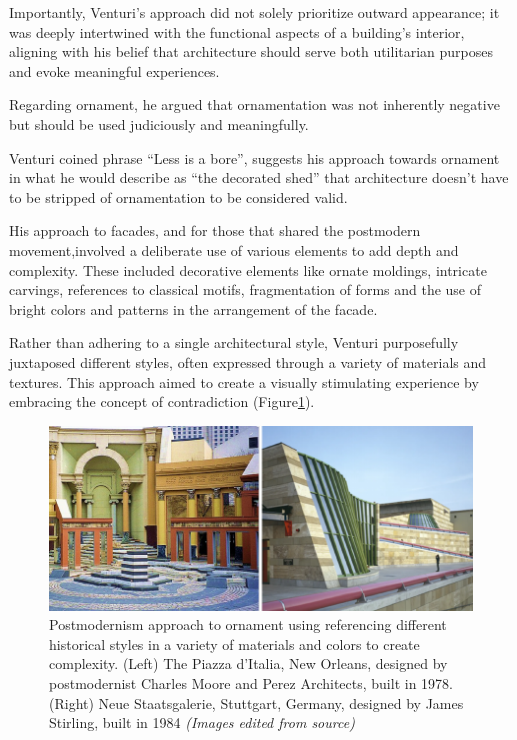 Importantly, Venturi's approach did not solely prioritize outward appearance;
it was deeply intertwined with the functional aspects of a building's interior, aligning with his belief that architecture should serve both utilitarian purposes and evoke meaningful experiences.

Regarding ornament, he argued that ornamentation was not inherently negative but should be used judiciously and meaningfully.

Venturi coined phrase ``Less is a bore'', suggests his approach towards ornament in what he would describe as ``the decorated shed''\cite{Venturi1972} that architecture doesn't have to be stripped of ornamentation to be considered valid.

His approach to facades, and for those that shared the postmodern movement,involved a deliberate use of various elements to add depth and complexity.
These included decorative elements like ornate moldings, intricate carvings, references to classical motifs, fragmentation of forms and the use of bright colors and patterns in the arrangement of the facade\cite{McLaughlin2023}.

Rather than adhering to a single architectural style, Venturi purposefully juxtaposed different styles, often expressed through a variety of materials and textures.
This approach aimed to create a visually stimulating experience by embracing the concept of contradiction (Figure\ref{fig:postmodernOrnamnet}).

     \begin{figure}[htb]
          \centering
          \includegraphics[width= \linewidth]{Images/PostmodernOrnament}
          \caption{Postmodernism approach to ornament using referencing different historical styles in a variety of materials and colors to create complexity. (Left) The Piazza d’Italia, New Orleans, designed by  postmodernist Charles Moore and Perez Architects, built in 1978. (Right) Neue Staatsgalerie, Stuttgart, Germany, designed by James Stirling, built in 1984 \textit{(Images edited from source)}}
          \label{fig:postmodernOrnamnet}
        \end{figure}

